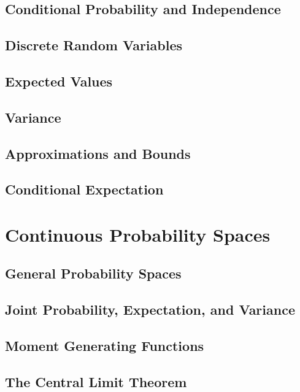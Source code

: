 \documentclass[10pt]{article}
\begin{document}
\newpage
\subsection{Conditional Probability and Independence}


\newpage
\subsection{Discrete Random Variables}


\newpage
\subsection{Expected Values}


\newpage
\subsection{Variance}


\newpage
\subsection{Approximations and Bounds}


\newpage
\subsection{Conditional Expectation}


\newpage
\section{Continuous Probability Spaces}
\subsection{General Probability Spaces}


\newpage
\subsection{Joint Probability, Expectation, and Variance}


\newpage
\subsection{Moment Generating Functions}


\newpage
\subsection{The Central Limit Theorem}

\end{document}
